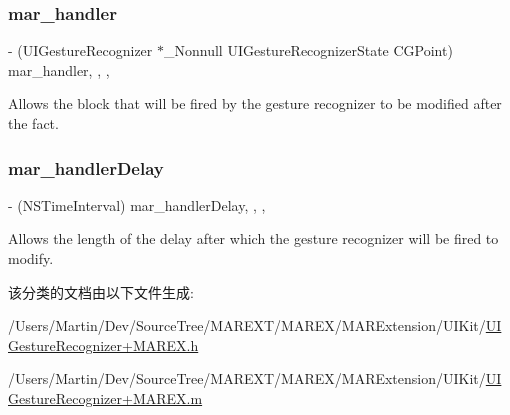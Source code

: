 \subsubsection{\texorpdfstring{mar\+\_\+handler}{mar\_handler}}
{\footnotesize\ttfamily -\/ (U\+I\+Gesture\+Recognizer $\ast$\+\_\+\+Nonnull U\+I\+Gesture\+Recognizer\+State C\+G\+Point) mar\+\_\+handler\hspace{0.3cm}{\ttfamily [read]}, {\ttfamily [write]}, {\ttfamily [nonatomic]}, {\ttfamily [copy]}}

Allows the block that will be fired by the gesture recognizer to be modified after the fact. \mbox{\label{category_u_i_gesture_recognizer_07_m_a_r_e_x___block_08_a3a5aedf9c3b8ffce2fa72d8021cb656d}} 
\subsubsection{\texorpdfstring{mar\+\_\+handler\+Delay}{mar\_handlerDelay}}
{\footnotesize\ttfamily -\/ (N\+S\+Time\+Interval) mar\+\_\+handler\+Delay\hspace{0.3cm}{\ttfamily [read]}, {\ttfamily [write]}, {\ttfamily [nonatomic]}, {\ttfamily [assign]}}

Allows the length of the delay after which the gesture recognizer will be fired to modify. 

该分类的文档由以下文件生成\+:\begin{DoxyCompactItemize}
\item 
/\+Users/\+Martin/\+Dev/\+Source\+Tree/\+M\+A\+R\+E\+X\+T/\+M\+A\+R\+E\+X/\+M\+A\+R\+Extension/\+U\+I\+Kit/\hyperlink{_u_i_gesture_recognizer_09_m_a_r_e_x_8h}{U\+I\+Gesture\+Recognizer+\+M\+A\+R\+E\+X.\+h}\item 
/\+Users/\+Martin/\+Dev/\+Source\+Tree/\+M\+A\+R\+E\+X\+T/\+M\+A\+R\+E\+X/\+M\+A\+R\+Extension/\+U\+I\+Kit/\hyperlink{_u_i_gesture_recognizer_09_m_a_r_e_x_8m}{U\+I\+Gesture\+Recognizer+\+M\+A\+R\+E\+X.\+m}\end{DoxyCompactItemize}

